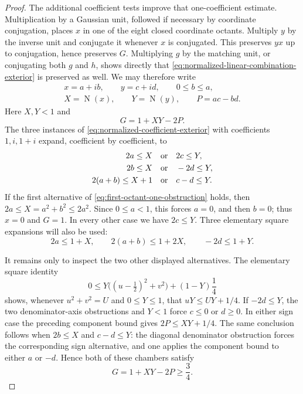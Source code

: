 \documentclass[11pt]{article}
\newcommand{\Norm}[1]{\operatorname{N}\!\left(#1\right)}
\begin{document}
\begin{proof}
The additional coefficient tests improve that one-coefficient estimate.
Multiplication by a Gaussian unit, followed if necessary by coordinate
conjugation, places $x$ in one of the eight closed coordinate octants.
Multiply $y$ by the inverse unit and conjugate it whenever $x$ is conjugated.
This preserves $yx$ up to conjugation, hence preserves $G$.  Multiplying
$g$ by the matching unit, or conjugating both $g$ and $h$, shows directly
that \eqref{eq:normalized-linear-combination-exterior} is preserved as well.
We may therefore write
\[
\begin{gathered}
 x=a+ib,\qquad y=c+id,\qquad 0\le b\le a,\\
 X=\Norm x,\qquad Y=\Norm y,\qquad P=ac-bd.
\end{gathered}
\]
Here $X,Y<1$ and
\begin{equation}
\label{eq:first-octant-gap-expansion}
                 G=1+XY-2P.
\end{equation}
The three instances of
\eqref{eq:normalized-coefficient-exterior} with coefficients $1,i,1+i$
expand, coefficient by coefficient, to
\begin{align}
 2a\le X &\quad\hbox{or}\quad 2c\le Y,
       \label{eq:first-octant-one-obstruction}\\
 2b\le X &\quad\hbox{or}\quad -2d\le Y,
       \label{eq:first-octant-i-obstruction}\\
 2(a+b)\le X+1 &\quad\hbox{or}\quad c-d\le Y.
       \label{eq:first-octant-diagonal-obstruction}
\end{align}
If the first alternative of
\eqref{eq:first-octant-one-obstruction} holds, then
$2a\le X=a^2+b^2\le2a^2$.  Since $0\le a<1$, this forces $a=0$, and then
$b=0$; thus $x=0$ and $G=1$.  In every other case we have
$2c\le Y$.  Three elementary square expansions will also be used:
\begin{equation}
\label{eq:first-octant-square-bounds}
 2a\le1+X,\qquad 2(a+b)\le1+2X,\qquad -2d\le1+Y.
\end{equation}

It remains only to inspect the two other displayed alternatives.  The
elementary square identity
\[
 0\le Y\bigl((u-\tfrac12)^2+v^2\bigr)
       +(1-Y)\frac14
\]
shows, whenever $u^2+v^2=U$ and $0\le Y\le1$, that
$uY\le UY+1/4$.  If $-2d\le Y$, the two denominator-axis obstructions and
$Y<1$ force $c\le0$ or $d\ge0$.  In either sign case the preceding component
bound gives $2P\le XY+1/4$.  The same conclusion follows when
$2b\le X$ and $c-d\le Y$: the diagonal denominator obstruction forces the
corresponding sign alternative, and one applies the component bound to
either $a$ or $-d$.  Hence both of these chambers satisfy
\[
                 G=1+XY-2P\ge\frac34.
\]


\end{proof}
\end{document}
